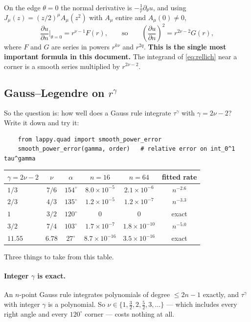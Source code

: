 \documentclass[11pt]{article}
\theoremstyle{definition}
\theoremstyle{remark}
\newcommand{\pd}[2]{\frac{\partial #1}{\partial #2}}
\begin{document}
On the edge $\theta=0$ the normal derivative is $-\frac1r\partial_\theta u$, and
using $J_\mu(z)=(z/2)^\mu A_\mu(z^2)$ with $A_\mu$ entire and $A_\mu(0)\ne0$,
\begin{equation}\label{eq:dudn}
  \pd{u}{n}\bigg|_{\theta=0}= r^{\nu-1}F(r),
  \qquad\text{so}\qquad
  \left(\pd{u}{n}\right)^{\!2} = r^{2\nu-2}G(r),
\end{equation}
where $F$ and $G$ are series in powers $r^{k\nu}$ and $r^{2q}$. \textbf{This is
the single most important formula in this document.} The integrand of
\eqref{eq:rellich} near a corner is a smooth series multiplied by $r^{2\nu-2}$.

\subsection{Gauss--Legendre on $r^\gamma$}

So the question is: how well does a Gauss rule integrate $\tau^\gamma$ with
$\gamma=2\nu-2$? Write it down and try it:
\begin{verbatim}
    from lappy.quad import smooth_power_error
    smooth_power_error(gamma, order)   # relative error on int_0^1 tau^gamma
\end{verbatim}

\begin{center}
\begin{tabular}{lccccc}
\toprule
$\gamma=2\nu-2$ & $\nu$ & $\alpha$ & $n=16$ & $n=64$ & fitted rate \\
\midrule
$1/3$    & $7/6$   & $154^\circ$ & $8.0\times10^{-5}$  & $2.1\times10^{-6}$  & $n^{-2.6}$\\
$2/3$    & $4/3$   & $135^\circ$ & $1.2\times10^{-5}$  & $1.2\times10^{-7}$  & $n^{-3.3}$\\
$1$      & $3/2$   & $120^\circ$ & $0$                 & $0$                 & exact\\
$3/2$    & $7/4$   & $103^\circ$ & $1.7\times10^{-7}$  & $1.8\times10^{-10}$ & $n^{-5.0}$\\
$11.55$  & $6.78$  & $27^\circ$  & $8.7\times10^{-16}$ & $3.5\times10^{-16}$ & exact\\
\bottomrule
\end{tabular}
\end{center}

\medskip\noindent
Three things to take from this table.

\paragraph{Integer $\gamma$ is exact.} An $n$-point Gauss rule integrates
polynomials of degree $\le 2n-1$ exactly, and $\tau^\gamma$ with integer $\gamma$
is a polynomial. So $\nu\in\{1,\tfrac32,2,\tfrac52,3,\dots\}$ --- which includes
every right angle and every $120^\circ$ corner --- costs nothing at all.
\end{document}
